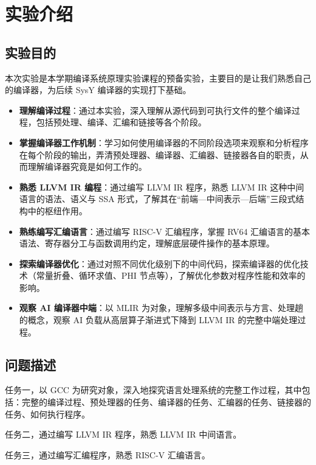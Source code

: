\documentclass[UTF8,a4paper,10pt]{ctexart}
\begin{document}
\section{实验介绍}

\subsection{实验目的}

本次实验是本学期编译系统原理实验课程的预备实验，主要目的是让我们熟悉自己的编译器，为后续 SysY 编译器的实现打下基础。

\begin{itemize}
  \item \textbf{理解编译过程}：通过本实验，深入理解从源代码到可执行文件的整个编译过程，包括预处理、编译、汇编和链接等各个阶段。
  \item \textbf{掌握编译器工作机制}：学习如何使用编译器的不同阶段选项来观察和分析程序在每个阶段的输出，弄清预处理器、编译器、汇编器、链接器各自的职责，从而理解编译器究竟是如何工作的。
  \item \textbf{熟悉 LLVM IR 编程}：通过编写 LLVM IR 程序，熟悉 LLVM IR 这种中间语言的语法、语义与 SSA 形式，了解其在“前端—中间表示—后端”三段式结构中的枢纽作用。
  \item \textbf{熟练编写汇编语言}：通过编写 RISC-V 汇编程序，掌握 RV64 汇编语言的基本语法、寄存器分工与函数调用约定，理解底层硬件操作的基本原理。
  \item \textbf{探索编译器优化}：通过对照不同优化级别下的中间代码，探索编译器的优化技术（常量折叠、循环求值、PHI 节点等），了解优化参数对程序性能和效率的影响。
  \item \textbf{观察 AI 编译器中端}：以 MLIR 为对象，理解多级中间表示与方言、处理趟的概念，观察 AI 负载从高层算子渐进式下降到 LLVM IR 的完整中端处理过程。
\end{itemize}

\subsection{问题描述}

任务一，以 GCC 为研究对象，深入地探究语言处理系统的完整工作过程，其中包括：完整的编译过程、预处理器的任务、编译器的任务、汇编器的任务、链接器的任务、如何执行程序。

任务二，通过编写 LLVM IR 程序，熟悉 LLVM IR 中间语言。

任务三，通过编写汇编程序，熟悉 RISC-V 汇编语言。
\end{document}
